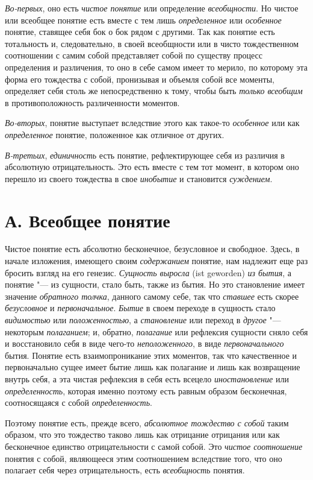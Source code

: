 {{\em Во-первых}, оно есть
{\em чистое понятие} или
определение {\em всеобщности}.
Но чистое или всеобщее понятие есть вместе с тем лишь
{\em определенное} или
{\em особенное} понятие,
ставящее себя бок о бок рядом с другими. Так как понятие есть тотальность
и, следовательно, в своей всеобщности или в чисто тождественном соотношении
с самим собой представляет собой по существу процесс определения и
различения, то оно в себе самом имеет то мерило, по которому эта форма его
тождества с собой, пронизывая и объемля собой все моменты, определяет себя
столь же непосредственно к тому, чтобы быть
{\em только всеобщим }в
противоположность различенности моментов.

{\em Во-вторых}, понятие
выступает вследствие этого как такое-то
{\em особенное} или как
{\em определенное}
понятие, положенное как отличное от других.

{\em В-третьих},
{\em единичность} есть
понятие, рефлектирующее себя из различия в абсолютную отрицательность. Это
есть вместе с тем тот момент, в котором оно перешло из своего тождества в
свое {\em инобытие} и
становится {\em суждением}.

\section[А. Всеобщее понятие]{А. Всеобщее понятие}
Чистое понятие есть абсолютно бесконечное, безусловное и
свободное. Здесь, в начале изложения, имеющего своим
{\em содержанием}
понятие, нам надлежит еще раз бросить взгляд на его генезис.
{\em Сущность выросла} (ist geworden)
{\em из бытия}, а понятие
"--- из сущности, стало быть, также из бытия. Но это становление
имеет значение {\em обратного толчка},
данного самому себе, так что
{\em ставшее} есть скорее
{\em безусловное} и
{\em первоначальное}.
{\em Бытие} в своем
переходе в сущность стало
{\em видимостью} или
{\em положенностью}, а
{\em становление} или
переход в {\em другое}
"--- некоторым
{\em полаганием}; и,
обратно, {\em полагание}
или рефлексия сущности сняло себя и восстановило себя в виде
чего-то {\em неположенного},
в виде
{\em первоначального}
бытия. Понятие есть взаимопроникание этих моментов, так что
качественное и первоначально сущее имеет бытие лишь как полагание и лишь
как возвращение внутрь себя, а эта чистая рефлексия в себя есть
всецело {\em иностановление}
или {\em определенность},
которая именно поэтому есть равным образом бесконечная,
соотносящаяся с собой
{\em определенность}.

Поэтому понятие есть, прежде всего,
{\em абсолютное тождество с собой}
таким образом, что это тождество таково лишь как отрицание
отрицания или как бесконечное единство отрицательности с самой собой. Это
{\em чистое соотношение}
понятия с собой, являющееся этим соотношением вследствие
того, что оно полагает себя через отрицательность, есть
{\em всеобщность}
понятия.

}
